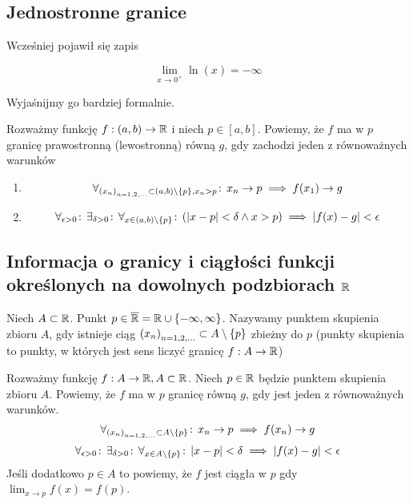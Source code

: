 \documentclass[9pt]{article}
\begin{document}
\subsection{Jednostronne granice}

Wcześniej pojawił się zapis

\[
    \lim_{x \to 0^+} \ln (x) = -\infty
\]

Wyjaśnijmy go bardziej formalnie.

\begin{Def}
    Rozważmy funkcję $f: (a,b) \to \mathbb{R}$ i niech $p \in [a,b]$. Powiemy, że $f$ ma w $p$ granicę
    prawostronną (lewostronną) równą $g$, gdy zachodzi jeden z równoważnych warunków

    \begin{enumerate}
        \item
            \[
                \forall_{\left(x_n\right)_{n = 1,2,...} \subset (a,b) \setminus \{p\}, x_n > p} \! : \, x_n \to p \implies f(x_1) \to
                g
            \]
        \item 
            \[
                \forall_{\epsilon > 0} \! : \, \exists_{\delta > 0} \! : \, \forall_{x \in (a,b)\setminus\{p\}} \! : \, \left(|x-p| < \delta
                \land x > p\right) \implies |f(x)-g| < \epsilon
            \]
    \end{enumerate}
\end{Def}

\subsection{Informacja o granicy i ciągłości funkcji określonych na dowolnych podzbiorach $\mathbb{R}$}

\begin{Def}
    Niech $A \subset \mathbb{R}$. Punkt $p \in \overline{\mathbb{R}} = \mathbb{R} \cup \{-\infty, \infty\}$. Nazywamy
    punktem skupienia zbioru $A$, gdy istnieje ciąg $\left(x_n\right)_{n = 1,2,...} \subset A \setminus \{p\}$ zbieżny do
    $p$ (punkty skupienia to punkty, w których jest sens liczyć granicę $f: A \to \mathbb{R}$)
\end{Def}

\begin{Def}
    Rozważmy funkcję $f: A \to \mathbb{R}, A \subset \mathbb{R}$. Niech $p \in \mathbb{R}$ będzie punktem skupienia zbioru
    $A$. Powiemy, że $f$ ma w $p$ granicę równą $g$, gdy jest jeden z równoważnych warunków.
    \[
        \forall_{\left(x_n\right)_{n = 1,2,...} \subset A \setminus \{p\}} \! : \, x_n \to p \implies f(x_n) \to g
    \]
    \[
        \forall_{\epsilon > 0} \! : \, \exists_{\delta > 0} \! : \, \forall_{x \in A \setminus \{p\}} \! : \, |x-p| < \delta \implies
        |f(x)-g| < \epsilon
    \]
    Jeśli dodatkowo $p \in A$ to powiemy, że $f$ jest ciągła w $p$ gdy $\lim_{x \to p} f(x) = f(p)$.
\end{Def}
\end{document}
